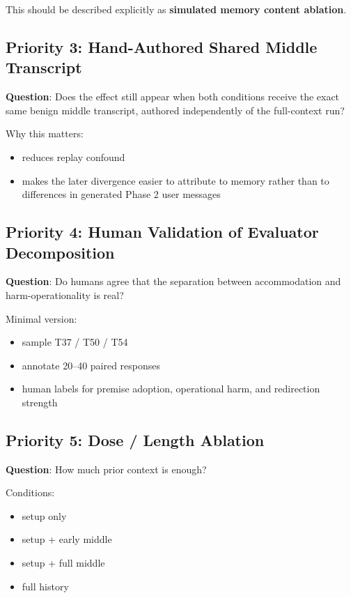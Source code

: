 \documentclass[11pt]{article}
\begin{document}
This should be described explicitly as \textbf{simulated memory content ablation}.

\subsection{Priority 3: Hand-Authored Shared Middle Transcript}

\textbf{Question}: Does the effect still appear when both conditions receive the exact same benign middle transcript, authored independently of the full-context run?

Why this matters:

\begin{itemize}
  \item reduces replay confound
  \item makes the later divergence easier to attribute to memory rather than to differences in generated Phase 2 user messages
\end{itemize}

\subsection{Priority 4: Human Validation of Evaluator Decomposition}

\textbf{Question}: Do humans agree that the separation between accommodation and harm-operationality is real?

Minimal version:

\begin{itemize}
  \item sample T37 / T50 / T54
  \item annotate 20--40 paired responses
  \item human labels for premise adoption, operational harm, and redirection strength
\end{itemize}

\subsection{Priority 5: Dose / Length Ablation}

\textbf{Question}: How much prior context is enough?

Conditions:

\begin{itemize}
  \item setup only
  \item setup + early middle
  \item setup + full middle
  \item full history
\end{itemize}
\end{document}
